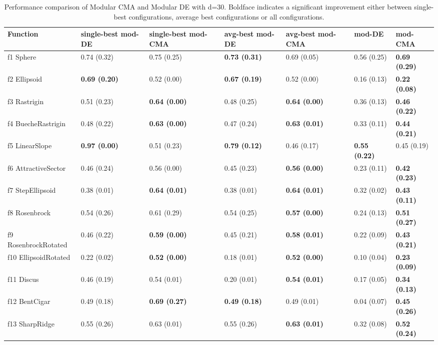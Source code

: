 \begin{table}
\caption{Performance comparison of Modular CMA and Modular DE with d=30. Boldface indicates a significant improvement either between single-best configurations, average best configurations or all configurations.}
\begin{tabular}{lllllll}
\toprule
Function & single-best mod-DE & single-best mod-CMA & avg-best mod-DE & avg-best mod-CMA & mod-DE & mod-CMA \\
\midrule
f1 Sphere & 0.74 (0.32) & 0.75 (0.25) & \textbf{0.73 (0.31)} & 0.69 (0.05) & 0.56 (0.25) & \textbf{0.69 (0.29)} \\
f2 Ellipsoid & \textbf{0.69 (0.20)} & 0.52 (0.00) & \textbf{0.67 (0.19)} & 0.52 (0.00) & 0.16 (0.13) & \textbf{0.22 (0.08)} \\
f3 Rastrigin & 0.51 (0.23) & \textbf{0.64 (0.00)} & 0.48 (0.25) & \textbf{0.64 (0.00)} & 0.36 (0.13) & \textbf{0.46 (0.22)} \\
f4 BuecheRastrigin & 0.48 (0.22) & \textbf{0.63 (0.00)} & 0.47 (0.24) & \textbf{0.63 (0.01)} & 0.33 (0.11) & \textbf{0.44 (0.21)} \\
f5 LinearSlope & \textbf{0.97 (0.00)} & 0.51 (0.23) & \textbf{0.79 (0.12)} & 0.46 (0.17) & \textbf{0.55 (0.22)} & 0.45 (0.19) \\
f6 AttractiveSector & 0.46 (0.24) & 0.56 (0.00) & 0.45 (0.23) & \textbf{0.56 (0.00)} & 0.23 (0.11) & \textbf{0.42 (0.23)} \\
f7 StepEllipsoid & 0.38 (0.01) & \textbf{0.64 (0.01)} & 0.38 (0.01) & \textbf{0.64 (0.01)} & 0.32 (0.02) & \textbf{0.43 (0.11)} \\
f8 Rosenbrock & 0.54 (0.26) & 0.61 (0.29) & 0.54 (0.25) & \textbf{0.57 (0.00)} & 0.24 (0.13) & \textbf{0.51 (0.27)} \\
f9 RosenbrockRotated & 0.46 (0.22) & \textbf{0.59 (0.00)} & 0.45 (0.21) & \textbf{0.58 (0.01)} & 0.22 (0.09) & \textbf{0.43 (0.21)} \\
f10 EllipsoidRotated & 0.22 (0.02) & \textbf{0.52 (0.00)} & 0.18 (0.01) & \textbf{0.52 (0.00)} & 0.10 (0.04) & \textbf{0.23 (0.09)} \\
f11 Discus & 0.46 (0.19) & 0.54 (0.01) & 0.20 (0.01) & \textbf{0.54 (0.01)} & 0.17 (0.05) & \textbf{0.34 (0.13)} \\
f12 BentCigar & 0.49 (0.18) & \textbf{0.69 (0.27)} & \textbf{0.49 (0.18)} & 0.49 (0.01) & 0.04 (0.07) & \textbf{0.45 (0.26)} \\
f13 SharpRidge & 0.55 (0.26) & 0.63 (0.01) & 0.55 (0.26) & \textbf{0.63 (0.01)} & 0.32 (0.08) & \textbf{0.52 (0.24)} \\

\end{tabular}
\end{table}
